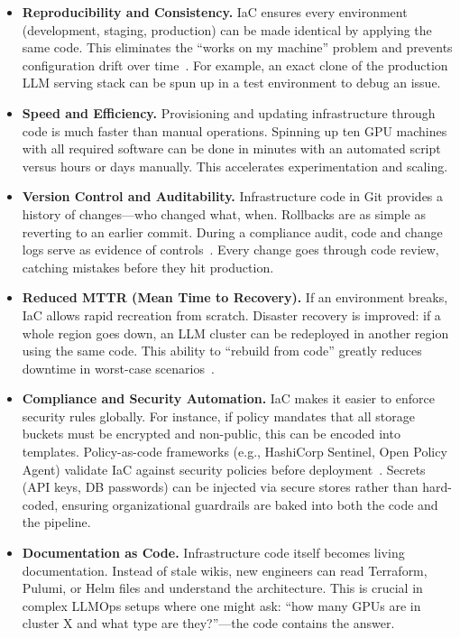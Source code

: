 \begin{itemize}
  \item \textbf{Reproducibility and Consistency.} 
  IaC ensures every environment (development, staging, production) can be made identical by applying the same code. 
  This eliminates the ``works on my machine'' problem and prevents configuration drift over time~\cite{terraform-docs}. 
  For example, an exact clone of the production LLM serving stack can be spun up in a test environment to debug an issue.

  \item \textbf{Speed and Efficiency.} 
  Provisioning and updating infrastructure through code is much faster than manual operations. 
  Spinning up ten GPU machines with all required software can be done in minutes with an automated script versus hours or days manually. 
  This accelerates experimentation and scaling.

  \item \textbf{Version Control and Auditability.} 
  Infrastructure code in Git provides a history of changes---who changed what, when. 
  Rollbacks are as simple as reverting to an earlier commit. 
  During a compliance audit, code and change logs serve as evidence of controls~\cite{terraform-docs}. 
  Every change goes through code review, catching mistakes before they hit production.

  \item \textbf{Reduced MTTR (Mean Time to Recovery).} 
  If an environment breaks, IaC allows rapid recreation from scratch. 
  Disaster recovery is improved: if a whole region goes down, an LLM cluster can be redeployed in another region using the same code. 
  This ability to ``rebuild from code'' greatly reduces downtime in worst-case scenarios~\cite{opa-docs}.

  \item \textbf{Compliance and Security Automation.} 
  IaC makes it easier to enforce security rules globally. 
  For instance, if policy mandates that all storage buckets must be encrypted and non-public, this can be encoded into templates. 
  Policy-as-code frameworks (e.g., HashiCorp Sentinel, Open Policy Agent) validate IaC against security policies before deployment~\cite{sentinel-docs,opa-docs}. 
  Secrets (API keys, DB passwords) can be injected via secure stores rather than hard-coded, ensuring organizational guardrails are baked into both the code and the pipeline.

  \item \textbf{Documentation as Code.} 
  Infrastructure code itself becomes living documentation. 
  Instead of stale wikis, new engineers can read Terraform, Pulumi, or Helm files and understand the architecture. 
  This is crucial in complex LLMOps setups where one might ask: ``how many GPUs are in cluster X and what type are they?''---the code contains the answer.
\end{itemize}

